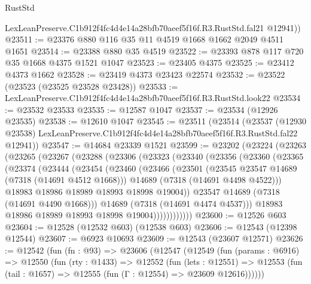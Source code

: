 \begin{lexlean}{RustStd}
\begin{coremodule}
        LexLeanPreserve.C1b912f4fc4d4e14a28bfb70aeef5f16f.R3.RustStd.fal21
        @12941))
@23511 := @23376 @880 @116 @35 @11 @4519 @1668 @1662 @2049 @4511 @1651
@23514 := @23388 @880 @35 @4519
@23522 := @23393 @878 @117 @720 @35 @1668 @4375 @1521 @1047
@23523 := @23405 @4375
@23525 := @23412 @4373 @1662
@23528 := @23419 @4373 @23423 @22574
@23532 := @23522 (@23523 (@23525 @23528 @23428))
@23533 := LexLeanPreserve.C1b912f4fc4d4e14a28bfb70aeef5f16f.R3.RustStd.look22
@23534 := @23532 @23533
@23535 := @12587 @1047
@23537 := @23534 (@12926 @23535)
@23538 := @12610 @1047
@23545 := @23511
    (@23514
      (@23537
        (@12930 @23538)
        LexLeanPreserve.C1b912f4fc4d4e14a28bfb70aeef5f16f.R3.RustStd.fal22
        @12941))
@23547 := @14684 @23339 @1521
@23599 := @23202
    (@23224
      (@23263
        (@23265
          (@23267
            (@23288
              (@23306
                (@23323
                  (@23340
                    (@23356
                      (@23360
                        (@23365
                          (@23374
                            (@23444
                              (@23454
                                (@23460
                                  (@23466
                                    (@23501
                                      (@23545 @23547 @14689 (@7318 (@14691 @4512 @1668)))
                                      @14689
                                      (@7318 (@14691 @4498 @4522)))
                                    @18983
                                    @18986
                                    @18989
                                    @18993
                                    @18998
                                    @19004))
                                @23547
                                @14689
                                (@7318 (@14691 @4490 @1668)))
                              @14689
                              (@7318 (@14691 @4474 @4537)))
                            @18983
                            @18986
                            @18989
                            @18993
                            @18998
                            @19004))))))))))))
@23600 := @12526 @603
@23604 := @12528 (@12532 @603) (@12538 @603)
@23606 := @12543 (@12398 @12544)
@23607 := @6923 @10693
@23609 := @12543 (@23607 @12571)
@23626 := @12542
    (fun (fn : @93) =>
    @23606
      (@12547
        (@12549
          (fun (params : @6916) =>
          @12550
            (fun (rty : @1433) =>
            @12552
              (fun (lets : @12551) =>
              @12553 (fun (tail : @1657) => @12555 (fun (Γ : @12554) => @23609 @12616))))))

\end{coremodule}
\end{lexlean}
